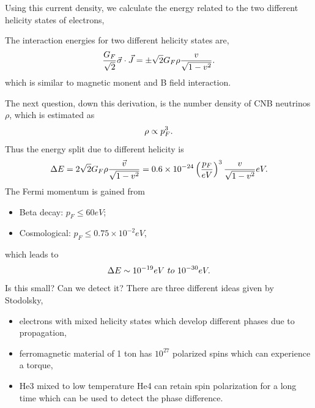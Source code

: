 \documentclass[letterpaper,12pt,english]{sphinxmanual}
\begin{document}
Using this current density, we calculate the energy related to the two different helicity states of electrons,

The interaction energies for two different helicity states are,
\begin{gather}
\begin{split}\frac{G_F}{\sqrt{2}} \vec \sigma\cdot \vec J = \pm \sqrt{2}G_F \rho \frac{ v}{\sqrt{1-v^2}}.\end{split}\notag
\end{gather}
which is similar to magnetic monent and B field interaction.

The next question, down this derivation, is the number density of CNB neutrinos \(\rho\), which is estimated as
\begin{gather}
\begin{split}\rho \propto p_F^3.\end{split}\notag
\end{gather}
Thus the energy split due to different helicity is
\begin{gather}
\begin{split}\Delta E = 2\sqrt{2}G_F \rho \frac{\vec v }{\sqrt{1-v^2}} = 0.6\times 10^{-24} \left( \frac{p_F}{eV}\right)^3 \frac{v}{\sqrt{1-v^2}} eV.\end{split}\notag
\end{gather}
The Fermi momentum is gained from
\begin{itemize}
\item {} 
Beta decay: \(p_F\leq 60 eV\);

\item {} 
Cosmological: \(p_F\leq 0.75\times 10^{-2} eV\),

\end{itemize}

which leads to
\begin{gather}
\begin{split}\Delta E \sim 10^{-19}  eV ~ to ~ 10^{-30}   eV.\end{split}\notag
\end{gather}
Is this small? Can we detect it? There are three different ideas given by Stodolsky,
\begin{itemize}
\item {} 
electrons with mixed helicity states which develop different phases due to propagation,

\item {} 
ferromagnetic material of 1 ton has \(10^{27}\) polarized spins which can experience a torque,

\item {} 
He3 mixed to low temperature He4 can retain spin polarization for a long time which can be used to detect the phase difference.

\end{itemize}
\end{document}
